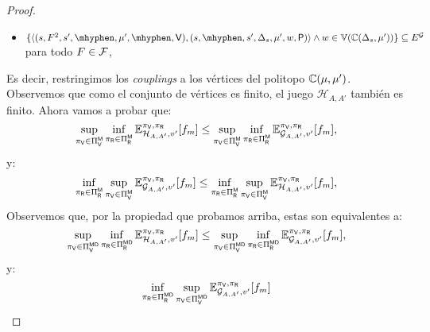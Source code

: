 \begin{proof}
\begin{itemize}
	 \item $\{ \langle (s, F^2, s', \mhyphen, \mu', \mhyphen, \Verifier), (s, \mhyphen, s', \Dirac_s, \mu', w, \Probabilistic) \rangle \wedge w \in \vertices{\couplings{\Dirac_s}{\mu'}} \} \subseteq E^\StochG$ para todo $F \in \mathcal{F}$,
\end{itemize}
Es decir, restringimos los \emph{couplings} a los vértices del politopo $\mathbb{C}(\mu,\mu')$.  Observemos que como el conjunto de vértices es finito, el juego  $\mathcal{H}_{A,A'}$ también es finito.  
Ahora vamos a probar que:
\begin{equation}\label{eq:theo:determined:eq2}
    \sup_{\pi_{\mathsf{V}} \in \Pi_{\mathsf{V}}^{\mathsf{M}}} \inf_{\pi_{\mathsf{R}} \in \Pi_{\mathsf{R}}^{\mathsf{M}}} \mathbb{E}_{\mathcal{H}_{A,A'},v'}^{\pi_{\mathsf{V}},\pi_{\mathsf{R}}}[f_{m}]
    \leq 
     \sup_{\pi_{\mathsf{V}} \in \Pi_{\mathsf{V}}^{\mathsf{M}}} \inf_{\pi_{\mathsf{R}} \in \Pi_{\mathsf{R}}^{\mathsf{M}}} \mathbb{E}_{\mathcal{G}_{A,A'},v'}^{\pi_{\mathsf{V}},\pi_{\mathsf{R}}}[f_{m}],
\end{equation}
y:
\begin{equation}\label{eq:theo:determined:eq3}
    \inf_{\pi_{\mathsf{R}} \in \Pi_{\mathsf{R}}^{\mathsf{M}}} \sup_{\pi_{\mathsf{V}} \in \Pi_{\mathsf{V}}^{\mathsf{M}}} \mathbb{E}_{\mathcal{G}_{A,A'},v'}^{\pi_{\mathsf{V}},\pi_{\mathsf{R}}}[f_{m}]
    \leq 
     \inf_{\pi_{\mathsf{R}} \in \Pi_{\mathsf{R}}^{\mathsf{M}}} \sup_{\pi_{\mathsf{V}} \in \Pi_{\mathsf{V}}^{\mathsf{M}}} \mathbb{E}_{\mathcal{H}_{A,A'},v'}^{\pi_{\mathsf{V}},\pi_{\mathsf{R}}}[f_{m}],
\end{equation}
    Observemos que, por la propiedad que probamos arriba, estas son equivalentes a:
\begin{equation}\label{eq:theo:determined:eq4}
    \sup_{\pi_{\mathsf{V}} \in \Pi_{\mathsf{V}}^{\mathsf{M}\mathsf{D}}} \inf_{\pi_{\mathsf{R}} \in \Pi_{\mathsf{R}}^{\mathsf{M}\mathsf{D}}} \mathbb{E}_{\mathcal{H}_{A,A'},v'}^{\pi_{\mathsf{V}},\pi_{\mathsf{R}}}[f_{m}]
    \leq 
     \sup_{\pi_{\mathsf{V}} \in \Pi_{\mathsf{V}}^{\mathsf{M}\mathsf{D}}} \inf_{\pi_{\mathsf{R}} \in \Pi_{\mathsf{R}}^{\mathsf{M}\mathsf{D}}} \mathbb{E}_{\mathcal{G}_{A,A'},v'}^{\pi_{\mathsf{V}},\pi_{\mathsf{R}}}[f_{m}],
\end{equation}
y:
\begin{equation}\label{eq:theo:determined:eq5}
    \inf_{\strat{\Refuter} \in \Strategies{\Refuter}^{\Memoryless\Deterministic}} \sup_{\strat{\Verifier} \in \Strategies{\Verifier}^{\Memoryless\Deterministic}} \mathbb{E}_{\mathcal{G}_{A,A'},v'}^{\strat{\Verifier},\strat{\Refuter}}[\FMask]

\end{equation}
\end{proof}
